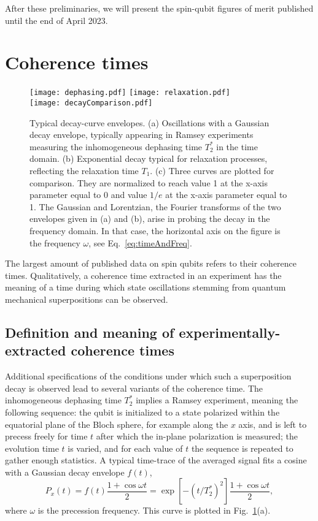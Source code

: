 \documentclass[aps, prx, showpacs, twocolumn, superscriptaddress, notitlepage, longbibliography, floatfix, nofootinbib]{revtex4-2}
\newcommand{\recheck}[1]{{#1}}
\newcommand{\separate}[1]
{
 #1
}
\begin{document}
\separate{
After these preliminaries, we will present the spin-qubit figures of merit published until \recheck{the end of April 2023}.
}

\section{Coherence times}

\label{sec:coherence}

\begin{figure}
\centering
  \texttt{[image: dephasing.pdf]} \hfill
  \texttt{[image: relaxation.pdf]} \hfill\\
  \texttt{[image: decayComparison.pdf]} \hfill
  \caption{\label{fig:envelopes} Typical decay-curve envelopes. (a) Oscillations with a Gaussian decay envelope, typically appearing in Ramsey experiments measuring the inhomogeneous dephasing time $T_2^*$ in the time domain. (b) Exponential decay typical for relaxation processes, reflecting the relaxation time $T_1$. (c) Three curves are plotted for comparison. They are normalized to reach value 1 at the x-axis parameter equal to 0 and value $1/e$ at the x-axis parameter equal to 1. The Gaussian and Lorentzian, the Fourier transforms of the two envelopes given in (a) and (b), arise in probing the decay in the frequency domain. In that case, the horizontal axis on the figure is the frequency $\omega$, see Eq.~\eqref{eq:timeAndFreq}.}
\end{figure}

The largest amount of published data on spin qubits refers to their coherence times. Qualitatively, a coherence time extracted in an experiment has the meaning of a time during which state oscillations stemming from quantum mechanical superpositions can be observed. 

\subsection{Definition and meaning of experimentally-extracted coherence times}

Additional specifications of the conditions under which such a superposition decay is observed lead to several variants of the coherence time. The inhomogeneous dephasing time $T_2^*$ implies a Ramsey experiment, meaning the following sequence: the qubit is initialized to a state polarized within the equatorial plane of the Bloch sphere, for example along the $x$ axis, and is left to precess freely for time $t$ after which the in-plane polarization is measured; the evolution time $t$ is varied, and for each value of $t$ the sequence is repeated to gather enough statistics. A typical time-trace of the averaged signal fits a cosine with a Gaussian decay envelope $f(t)$,
\begin{equation}
P_x(t) = f(t)\frac{1+\cos \omega t}{2} = \exp\left[-(t / T_2^*)^2\right] \frac{1+\cos \omega t}{2},
\label{eq:dephasing}
\end{equation}
where $\omega$ is the precession frequency. This curve is plotted in Fig.~\ref{fig:envelopes}(a). 
\end{document}
